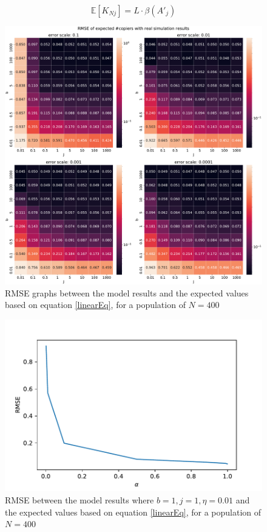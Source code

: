 \documentclass[11pt]{article}
\begin{document}
\begin{equation}\label{linearEq}
\mathbb{E}[K_{Nj}] = L\cdot \beta(A'_j)
\end{equation}

\begin{figure}
    \includegraphics[width=\linewidth]{GBD_rmse_heatmap.pdf}
    \caption{RMSE graphs between the model results and the expected values based on equation \ref{linearEq}, for a population of $N=400$}
    \label{RMSE}
\end{figure}

\begin{figure}
    \includegraphics[width=\linewidth]{alpha_rmse.pdf}
    \caption{RMSE between the model results where $b=1,j=1,\eta=0.01$ and the expected values based on equation \ref{linearEq}, for a population of $N=400$}
    \label{RMSE:alpha}
\end{figure}
\end{document}
